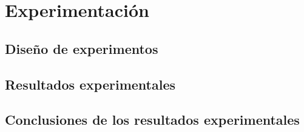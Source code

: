 
\section{Experimentación} \label{sec:experimentacion}

\subsection{Diseño de experimentos} \label{sec:diseno_experimentos} %



\subsection{Resultados experimentales} \label{sec:resultados_experimentales} %



\subsection{Conclusiones de los resultados experimentales} \label{sec:conclusiones_resultados} %

